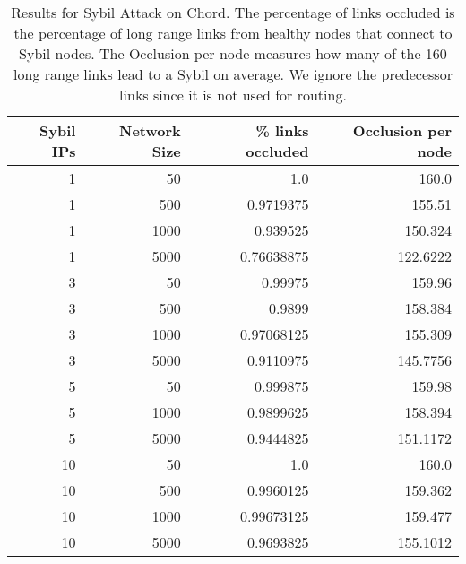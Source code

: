 \documentclass[a4paper]{article}
\begin{document}
\begin{table}[h]\small
    
    \begin{center}
        
        \begin{tabular}{|r|r|r|r|}
            \hline 
            Sybil IPs & Network Size &  \% links occluded & Occlusion per node \\ \hline
            1 & 50 & 1.0 & 160.0 \\ \hline
            1 & 500 & 0.9719375 & 155.51 \\ \hline
            1 & 1000 & 0.939525 & 150.324 \\ \hline
            1 & 5000 & 0.76638875 & 122.6222 \\ \hline
            3 & 50 & 0.99975 & 159.96 \\ \hline
            3 & 500 & 0.9899 & 158.384 \\ \hline
            3 & 1000 & 0.97068125 & 155.309 \\ \hline
            3 & 5000 & 0.9110975 & 145.7756 \\ \hline
            5 & 50 & 0.999875 & 159.98 \\ \hline
            5 & 1000 & 0.9899625 & 158.394 \\ \hline
            5 & 5000 & 0.9444825 & 151.1172 \\ \hline
            10 & 50 & 1.0 & 160.0 \\ \hline
            10 & 500 & 0.9960125 & 159.362 \\ \hline
            10 & 1000 & 0.99673125 & 159.477 \\ \hline
            10 & 5000 & 0.9693825 & 155.1012 \\ \hline
            
            
        \end{tabular}
        \label{exp3}
        \caption{Results for Sybil Attack on Chord. The percentage of links occluded is the percentage of long range links from healthy nodes that connect to Sybil nodes. 
            The Occlusion per node measures how many of the 160 long range links lead to a Sybil on average.  
            We ignore the predecessor links since it is not used for routing.}
    \end{center}
    
    
\end{table}
\label{sec:horror}

\end{document}
